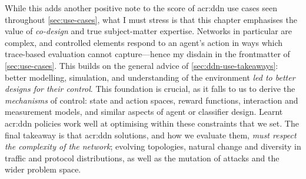 While this adds another positive note to the score of \gls{acr:ddn} use cases seen throughout \cref{sec:use-cases}, what I must stress is that this chapter emphasises the value of \emph{co-design} and true subject-matter expertise.
Networks in particular are complex, and controlled elements respond to an agent's action in ways which trace-based evaluation cannot capture---hence my disdain in the frontmatter of \cref{sec:use-cases}.
This builds on the general advice of \cref{sec:ddn-use-takeaways}: better modelling, simulation, and understanding of the environment \emph{led to better designs for their control}.
This foundation is crucial, as it falls to us to derive the \emph{mechanisms} of control: state and action spaces, reward functions, interaction and measurement models, and similar aspects of agent or classifier design.
Learnt \gls{acr:ddn} policies work well at optimising within these constraints that we set.
The final takeaway is that \gls{acr:ddn} solutions, and how we evaluate them, \emph{must respect the complexity of the network}; evolving topologies, natural change and diversity in traffic and protocol distributions, as well as the mutation of attacks and the wider problem space.


